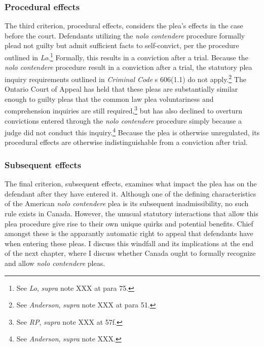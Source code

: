 \subsubsection{Procedural effects}

The third criterion, procedural effects, considers the plea's effects in the case before the court. Defendants utilizing the \textit{nolo contendere} procedure formally plead not guilty but admit sufficient facts to self-convict, per the procedure outlined in \textit{Lo}.\footnote{See \textit{Lo}, \textit{supra} note XXX at para 75.} Formally, this results in a conviction after a trial. Because the \textit{nolo contendere} procedure result in a conviction after a trial, the statutory plea inquiry requirements outlined in \textit{Criminal Code} s 606(1.1) do not apply.\footnote{See \textit{Anderson}, \textit{supra} note XXX at para 51.} The Ontario Court of Appeal has held that these pleas are substantially similar enough to guilty pleas that the common law plea voluntariness and comprehension inquiries are still required,\footnote{See \textit{RP}, \textit{supra} note XXX at 57f.} but has also declined to overturn convictions entered through the \textit{nolo contendere} procedure simply because a judge did not conduct this inquiry.\footnote{See \textit{Anderson}, \textit{supra} note XXX.} Because the plea is otherwise unregulated, its procedural effects are otherwise indistinguishable from a conviction after trial.

\subsubsection{Subsequent effects}

The final criterion, subsequent effects, examines what impact the plea has on the defendant after they have entered it. Although one of the defining characteristics of the American \textit{nolo contendere} plea is its subsequent inadmissibility, no such rule exists in Canada. However, the unusual statutory interactions that allow this plea procedure give rise to their own unique quirks and potential benefits. Chief amongst these is the apparantly automatic right to appeal that defendants have when entering these pleas. I discuss this windfall and its implications at the end of the next chapter, where I discuss whether Canada ought to formally recognize and allow \textit{nolo contendere} pleas.